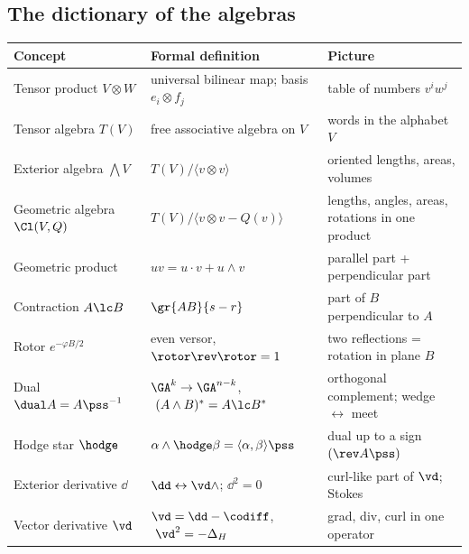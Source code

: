 \subsection{The dictionary of the algebras}
\begin{center}
\renewcommand{\arraystretch}{1.35}
\begin{tabular}{p{4.6cm}p{5.6cm}p{4.6cm}}
\hline
\textbf{Concept} & \textbf{Formal definition} & \textbf{Picture}\\\hline
Tensor product $V\otimes W$ & universal bilinear map; basis $e_i\otimes f_j$ & table of numbers $v^iw^j$\\
Tensor algebra $T(V)$ & free associative algebra on $V$ & words in the alphabet $V$\\
Exterior algebra $\bigwedge V$ & $T(V)/\langle v\otimes v\rangle$ & oriented lengths, areas, volumes\\
Geometric algebra $\Cl(V,Q)$ & $T(V)/\langle v\otimes v-Q(v)\rangle$ & lengths, angles, areas, rotations in one product\\
Geometric product & $uv=u\cdot v+u\wedge v$ & parallel part + perpendicular part\\
Contraction $A\lc B$ & $\gr{AB}{s-r}$ & part of $B$ perpendicular to $A$\\
Rotor $e^{-\varphi B/2}$ & even versor, $\rotor\rev\rotor=1$ & two reflections = rotation in plane $B$\\
Dual $\dual A=A\pss^{-1}$ & $\GA^k\to\GA^{n-k}$, $\ (A\wedge B)^*=A\lc B^*$ & orthogonal complement; wedge $\leftrightarrow$ meet\\
Hodge star $\hodge$ & $\alpha\wedge\hodge\beta=\langle\alpha,\beta\rangle\pss$ & dual up to a sign $(\rev A\pss)$\\
Exterior derivative $\dd$ & $\dd\leftrightarrow\vd\wedge$; $\dd^2=0$ & curl-like part of $\vd$; Stokes\\
Vector derivative $\vd$ & $\vd=\dd-\codiff$, $\ \vd^2=-\Delta_H$ & grad, div, curl in one operator\\\hline
\end{tabular}
\end{center}
